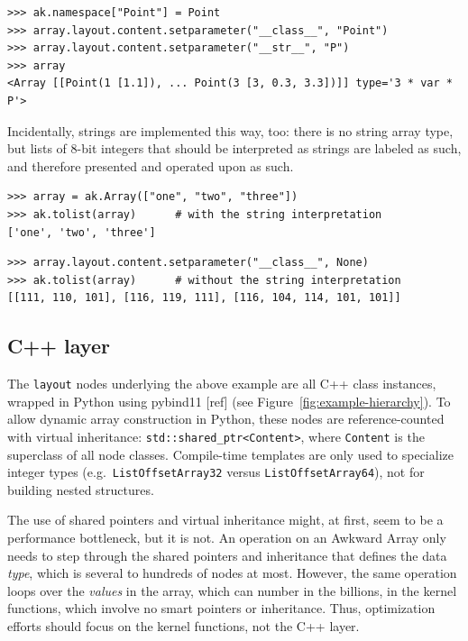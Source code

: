 \documentclass{webofc}
\begin{document}
\begin{verbatim}
>>> ak.namespace["Point"] = Point
>>> array.layout.content.setparameter("__class__", "Point")
>>> array.layout.content.setparameter("__str__", "P")
>>> array
<Array [[Point(1 [1.1]), ... Point(3 [3, 0.3, 3.3])]] type='3 * var * P'>
\end{verbatim}

\noindent Incidentally, strings are implemented this way, too: there is no string array type, but lists of 8-bit integers that should be interpreted as strings are labeled as such, and therefore presented and operated upon as such.

\begin{verbatim}
>>> array = ak.Array(["one", "two", "three"])
>>> ak.tolist(array)      # with the string interpretation
['one', 'two', 'three']
\end{verbatim}

\begin{verbatim}
>>> array.layout.content.setparameter("__class__", None)
>>> ak.tolist(array)      # without the string interpretation
[[111, 110, 101], [116, 119, 111], [116, 104, 114, 101, 101]]
\end{verbatim}

\subsection{C++ layer}

The \texttt{layout} nodes underlying the above example are all C++ class instances, wrapped in Python using pybind11 [ref] (see Figure~\ref{fig:example-hierarchy}). To allow dynamic array construction in Python, these nodes are reference-counted with virtual inheritance: \texttt{std::shared_ptr<Content>}, where \texttt{Content} is the superclass of all node classes. Compile-time templates are only used to specialize integer types (e.g.\ \texttt{ListOffsetArray32} versus \texttt{ListOffsetArray64}), not for building nested structures.

The use of shared pointers and virtual inheritance might, at first, seem to be a performance bottleneck, but it is not. An operation on an Awkward Array only needs to step through the shared pointers and inheritance that defines the data {\it type}, which is several to hundreds of nodes at most. However, the same operation loops over the {\it values} in the array, which can number in the billions, in the kernel functions, which involve no smart pointers or inheritance. Thus, optimization efforts should focus on the kernel functions, not the C++ layer.
\end{document}
